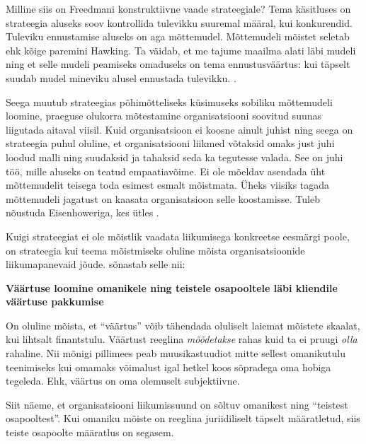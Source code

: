 Milline siis on Freedmani konstruktiivne vaade strateegiale? Tema käsitluses on strateegia aluseks soov kontrollida tulevikku suuremal määral, kui konkurendid. Tuleviku ennustamise aluseks on aga mõttemudel. Mõttemudeli mõistet seletab ehk kõige paremini Hawking\cite{mlodinow2010grand}. Ta väidab, et me tajume maailma alati läbi mudeli ning et selle mudeli peamiseks omaduseks on tema ennustusväärtus: kui täpselt suudab mudel mineviku alusel ennustada tulevikku. . 

Seega muutub strateegias põhimõtteliseks küsimuseks sobiliku mõttemudeli loomine, praeguse olukorra mõtestamine organisatsiooni soovitud suunas liigutada aitaval viisil. Kuid organisatsioon ei koosne ainult juhist ning seega on strateegia puhul oluline, et organisatsiooni liikmed võtaksid omaks just juhi loodud malli ning suudaksid ja tahaksid seda ka tegutesse valada. See on juhi töö, mille aluseks on teatud empaatiavõime. Ei ole mõeldav asendada üht mõttemudelit teisega toda esimest esmalt mõistmata. Üheks viisiks tagada mõttemudeli jagatust on kaasata organisatsioon selle koostamisse. Tuleb nõustuda Eisenhoweriga, kes ütles . 

Kuigi strateegiat ei ole mõistlik vaadata liikumisega konkreetse eesmärgi poole, on strateegia kui teema mõistmiseks oluline mõista organisatsioonide liikumapanevaid jõude. \citeauthor{de2006strategy} sõnastab selle nii:

\begin{center}
	\textbf{Väärtuse loomine omanikele ning teistele osapooltele läbi kliendile väärtuse pakkumise}
\end{center}

On oluline mõista, et \enquote{väärtus} võib tähendada oluliselt laiemat mõistete skaalat, kui lihtsalt finantstulu. Väärtust reeglina \emph{mõõdetakse} rahas kuid ta ei pruugi \emph{olla} rahaline. Nii mõnigi pillimees peab muusikastuudiot mitte sellest omanikutulu teenimiseks kui omamaks võimalust igal hetkel koos sõpradega oma hobiga tegeleda. Ehk, väärtus on oma olemuselt subjektiivne. 

Siit näeme, et organisatsiooni liikumissuund on sõltuv omanikest ning \enquote{teistest osapooltest}. Kui omaniku mõiste on reeglina juriidiliselt täpselt määratletud, siis teiste osapoolte määratlus on segasem. 

